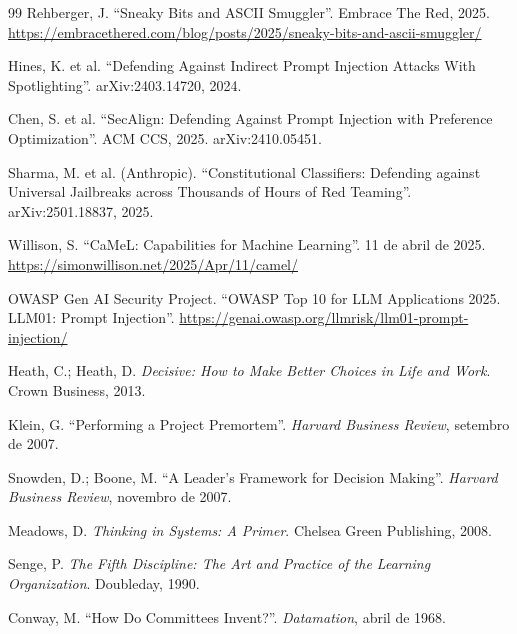 \documentclass[11pt,a4paper]{article}
\begin{document}
{\begin{thebibliography}{99}
Rehberger, J. \enquote{Sneaky Bits and ASCII Smuggler}. Embrace The Red, 2025. \url{https://embracethered.com/blog/posts/2025/sneaky-bits-and-ascii-smuggler/}

Hines, K. et al. \enquote{Defending Against Indirect Prompt Injection Attacks With Spotlighting}. arXiv:2403.14720, 2024.

Chen, S. et al. \enquote{SecAlign: Defending Against Prompt Injection with Preference Optimization}. ACM CCS, 2025. arXiv:2410.05451.

Sharma, M. et al. (Anthropic). \enquote{Constitutional Classifiers: Defending against Universal Jailbreaks across Thousands of Hours of Red Teaming}. arXiv:2501.18837, 2025.

Willison, S. \enquote{CaMeL: Capabilities for Machine Learning}. 11 de abril de 2025. \url{https://simonwillison.net/2025/Apr/11/camel/}

OWASP Gen AI Security Project. \enquote{OWASP Top 10 for LLM Applications 2025. LLM01: Prompt Injection}. \url{https://genai.owasp.org/llmrisk/llm01-prompt-injection/}

Heath, C.; Heath, D. \emph{Decisive: How to Make Better Choices in Life and Work}. Crown Business, 2013.

Klein, G. \enquote{Performing a Project Premortem}. \emph{Harvard Business Review}, setembro de 2007.

Snowden, D.; Boone, M. \enquote{A Leader's Framework for Decision Making}. \emph{Harvard Business Review}, novembro de 2007.

Meadows, D. \emph{Thinking in Systems: A Primer}. Chelsea Green Publishing, 2008.

Senge, P. \emph{The Fifth Discipline: The Art and Practice of the Learning Organization}. Doubleday, 1990.

Conway, M. \enquote{How Do Committees Invent?}. \emph{Datamation}, abril de 1968.

\end{thebibliography}
}
\end{document}
